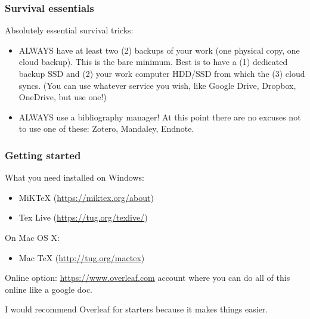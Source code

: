 \documentclass{beamer}
\begin{document}



\begin{frame}
\frametitle{Survival essentials}
Absolutely essential survival tricks:
\begin{itemize}
    \item ALWAYS have at least two (2) backups of your work (one physical copy, one cloud backup). This is the bare minimum. Best is to have a (1) dedicated backup SSD and (2) your work computer HDD/SSD from which the (3) cloud syncs. (You can use whatever service you wish, like Google Drive, Dropbox, OneDrive, but use one!) \pause
    \item ALWAYS use a bibliography manager! At this point there are no excuses not to use one of these: Zotero, Mandaley, Endnote. 
\end{itemize}
\end{frame}




\begin{frame}
\frametitle{Getting started}
What you need installed on Windows:
\begin{itemize}
\item MiKTeX  (\url{https://miktex.org/about})
\item Tex Live (\url{https://tug.org/texlive/})
\end{itemize}

On Mac OS X:
\begin{itemize}
	\item Mac TeX (\url{http://tug.org/mactex})
\end{itemize}

\bigskip
Online option: \url{https://www.overleaf.com} account where you can do all of this online like a google doc.

I would recommend Overleaf for starters because it makes things easier.
\end{frame}



\end{document}
